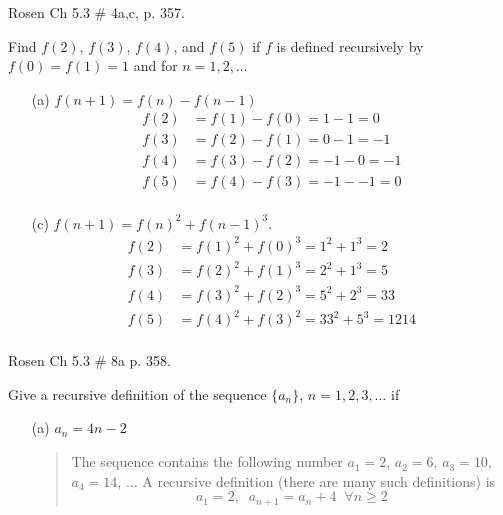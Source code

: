 \documentclass[11pt]{exam}
\begin{document}
\begin{questions}
\question[8] Rosen Ch 5.3 \# 4a,c, p. 357.
\begin{solution}
Find $f(2)$, $f(3)$, $f(4)$, and $f(5)$ if $f$ is defined
recursively by $f(0) = f(1) = 1$ and for $n=1,2,\ldots$
\begin{itemize}
    \item[(a)] $f(n+1) = f(n) - f(n-1)$
    \begin{align*}
        f(2) &= f(1) - f(0) = 1 - 1 = 0 \\
        f(3) &= f(2) - f(1) = 0 - 1 = -1 \\
        f(4) &= f(3) - f(2) = -1 - 0 = -1 \\
        f(5) &= f(4) - f(3) = -1 - -1 = 0 \\
    \end{align*}
    \item[(c)] $f(n+1) = f(n)^2 + f(n-1)^3$.
    \begin{align*}
        f(2) &= f(1)^2 + f(0)^3 = 1^2 + 1^3 = 2 \\
        f(3) &= f(2)^2 + f(1)^3 = 2^2 + 1^3 = 5 \\
        f(4) &= f(3)^2 + f(2)^3 = 5^2 + 2^3 = 33 \\
        f(5) &= f(4)^2 + f(3)^2 = 33^2 + 5^3 = 1214 \\
    \end{align*}
\end{itemize}
\end{solution}


\question[4] Rosen Ch 5.3 \# 8a p. 358.
\begin{solution}
Give a recursive definition of the sequence $\{a_n\}$, $n=1,2,3,
\ldots$ if
\begin{itemize}
    \item[(a)] $a_n = 4n-2$
    \begin{quote}
        The sequence contains the following number $a_1 = 2$, $a_2 = 6$, $a_3 = 10$, $a_4 = 14$, ...
        A recursive definition (there are many such definitions) is
        \[  a_1 = 2, \;\; a_{n+1} = a_n + 4 \;\; \forall n \geq 2 \]
    \end{quote}
\end{itemize}
\end{solution}



\end{questions}
\end{document}
